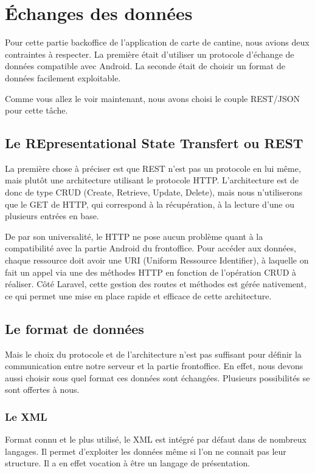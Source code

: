 \section{Échanges des données}

Pour cette partie backoffice de l'application de carte de cantine, nous avions
deux contraintes à respecter. La première était d'utiliser un protocole d'échange
 de données compatible avec Android. La seconde était de choisir un format de données
 facilement exploitable.

 Comme vous allez le voir maintenant, nous avons choisi le couple REST/JSON pour cette
 tâche.

\subsection{Le REpresentational State Transfert ou REST}

La première chose à préciser est que REST n'est pas un protocole en lui même, mais
plutôt une architecture utilisant le protocole HTTP. L'architecture est de donc de type
CRUD (Create, Retrieve, Update, Delete), mais nous n'utiliserons que le GET de HTTP,
qui correspond à la récupération, à la lecture d'une ou plusieurs entrées en base.

De par son universalité, le HTTP ne pose aucun problème quant à la compatibilité
avec la partie Android du frontoffice. Pour accéder aux données, chaque ressource doit
avoir une URI (Uniform Ressource Identifier), à laquelle on fait un appel via une
des méthodes HTTP en fonction de l'opération CRUD à réaliser. Côté Laravel, cette
gestion des routes et méthodes est gérée nativement, ce qui permet une mise en place
rapide et efficace de cette architecture.

\subsection{Le format de données}

Mais le choix du protocole et de l'architecture n'est pas suffisant pour définir
la communication entre notre serveur et la partie frontoffice. En effet, nous devons
aussi choisir sous quel format ces données sont échangées. Plusieurs possibilités
se sont offertes à nous.

\subsubsection{Le XML}

Format connu et le plus utilisé, le XML est intégré par défaut dans de nombreux
langages. Il permet d'exploiter les données même si l'on ne connait pas leur structure.
Il a en effet vocation à être un langage de présentation.

